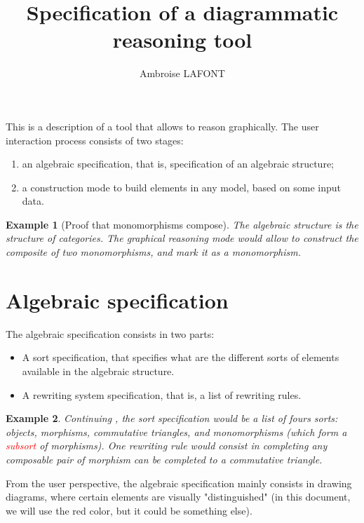 \documentclass{article}
\title{Specification of a diagrammatic reasoning tool}
\author{Ambroise LAFONT}
\newtheorem{example}{Example}[section]
\begin{document}
\maketitle{}
This is a description of a tool that allows to reason graphically. 
The user interaction process consists of two stages:
\begin{enumerate}
    \item an algebraic specification, that is, specification of an algebraic structure;
    \item a construction mode 
    to build elements in any model, based on some input data.
    \end{enumerate}
    \begin{example}[Proof that monomorphisms compose]
        \label{ex:proof-mono}
        The algebraic structure is the structure of categories.
        The graphical reasoning mode would allow to construct the composite of two monomorphisms, and mark it as a monomorphism.
    \end{example}
\section{Algebraic specification}
The algebraic specification consists in two parts:
\begin{itemize}
    \item A sort specification, that specifies what are the different sorts of elements available in the algebraic structure.
    \item A rewriting system specification, that is, a list of rewriting rules.
\end{itemize}

\begin{example}
    \label{ex:proof-mono-alg-spec}
    Continuing , the sort specification would be a list of fours sorts: objects, morphisms, commutative triangles, and monomorphisms 
    (which form a \textcolor{red}{subsort} of morphisms).
One rewriting rule would consist in completing 
any composable pair of morphism can be completed to a commutative triangle.
\end{example}

From the user perspective, the algebraic specification mainly consists in drawing diagrams, where certain elements are visually "distinguished" (in this document, we will use the red color, but it could be something else).
\tableofcontents
\end{document}
